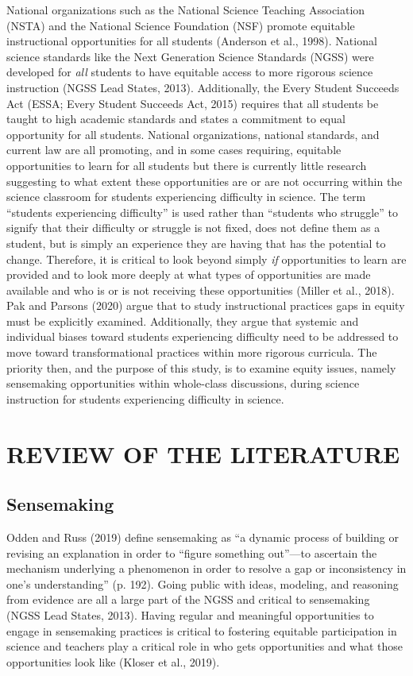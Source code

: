 \documentclass{sig-alternate} %
\begin{document}
\begin{large}
National organizations such as the National Science Teaching Association (NSTA) and the National Science Foundation (NSF) promote equitable instructional opportunities for all students (Anderson et al., 1998). National science standards like the Next Generation Science Standards (NGSS) were developed for \textit{all} students to have equitable access to more rigorous science instruction (NGSS Lead States, 2013). Additionally, the Every Student Succeeds Act (ESSA; Every Student Succeeds Act, 2015) requires that all students be taught to high academic standards and states a commitment to equal opportunity for all students. National organizations, national standards, and current law are all promoting, and in some cases requiring, equitable opportunities to learn for all students but there is currently little research suggesting to what extent these opportunities are or are not occurring within the science classroom for students experiencing difficulty in science. The term “students experiencing difficulty” is used rather than “students who struggle” to signify that their difficulty or struggle is not fixed, does not define them as a student, but is simply an experience they are having that has the potential to change. Therefore, it is critical to look beyond simply \textit{if} opportunities to learn are provided and to look more deeply at what types of opportunities are made available and who is or is not receiving these opportunities (Miller et al., 2018). Pak and Parsons (2020) argue that to study instructional practices gaps in equity must be explicitly examined. Additionally, they argue that systemic and individual biases toward students experiencing difficulty need to be addressed to move toward transformational practices within more rigorous curricula. The priority then, and the purpose of this study, is to examine equity issues, namely sensemaking opportunities within whole-class discussions, during science instruction for students experiencing difficulty in science.

\section*{REVIEW OF THE LITERATURE}

\subsection*{Sensemaking}

Odden and Russ (2019) define sensemaking as “a dynamic process of building or revising an explanation in order to “figure something out”—to ascertain the mechanism underlying a phenomenon in order to resolve a gap or inconsistency in one's understanding” (p. 192). Going public with ideas, modeling, and reasoning from evidence are all a large part of the NGSS and critical to sensemaking (NGSS Lead States, 2013). Having regular and meaningful opportunities to engage in sensemaking practices is critical to fostering equitable participation in science and teachers play a critical role in who gets opportunities and what those opportunities look like (Kloser et al., 2019).


\end{large}
\end{document}
